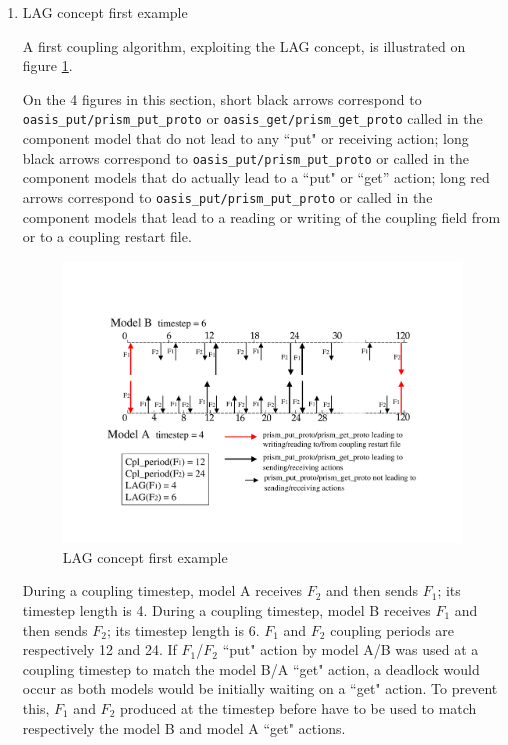   \begin{enumerate}

  \item LAG concept first example
 
  A first coupling algorithm, exploiting the LAG concept, is
  illustrated on figure \ref{fig:lag_concept_1}. 

  On the 4 figures in this section, short black arrows correspond to {\tt
  oasis\_put/prism\_put\_proto} or {\tt oasis\_get/prism\_get\_proto} called in the component model
  that do not lead to any ``put" or receiving action;
  long black arrows correspond to {\tt oasis\_put/prism\_put\_proto} or  called in the component models that do
  actually lead to a ``put" or ``get'' action;
  long red arrows correspond to {\tt oasis\_put/prism\_put\_proto} or  called in the component models that lead to a
  reading or writing of the coupling field from or to a coupling
  restart file.

\begin{figure}
\includegraphics[scale=.6]{figures/fig_lag_concept_1}
\caption{LAG concept first example} 
\label{fig:lag_concept_1}
\end{figure}

  During a coupling timestep, model A receives $F_2$ and then sends $F_1$; its
  timestep length is 4. During a coupling timestep, model B receives $F_1$
  and then sends $F_2$; its timestep length is 6.  $F_1$ and $F_2$
  coupling periods are respectively 12 and 24. If $F_1$/$F_2$ ``put"
  action by model A/B was used at a coupling timestep to match the
  model B/A ``get" action, a deadlock would occur as both models
  would be initially waiting on a ``get" action. To prevent this,
  $F_1$ and $F_2$ produced at the timestep before have to be used to
  match respectively the model B and model A ``get" actions.


\end{enumerate}
